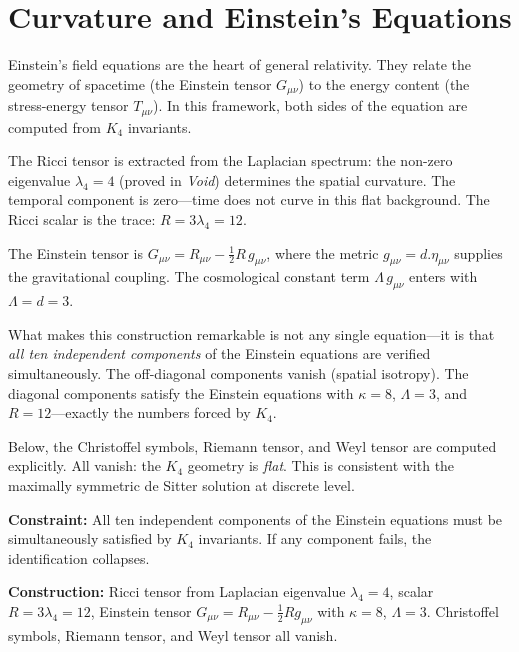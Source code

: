 \documentclass[11pt,a4paper]{book}
\def\cdot{.}%
\begin{document}
\chapter{Curvature and Einstein's Equations}
\label{ch:einstein-equations}

Einstein's field equations are the heart of general relativity. They relate the geometry of spacetime (the Einstein tensor $G_{\mu\nu}$) to the energy content (the stress-energy tensor $T_{\mu\nu}$). In this framework, both sides of the equation are computed from $K_4$ invariants.

The Ricci tensor is extracted from the Laplacian spectrum: the non-zero eigenvalue $\lambda_4 = 4$ (proved in \textit{Void}) determines the spatial curvature. The temporal component is zero---time does not curve in this flat background. The Ricci scalar is the trace: $R = 3\lambda_4 = 12$.

The Einstein tensor is $G_{\mu\nu} = R_{\mu\nu} - \frac{1}{2}R\,g_{\mu\nu}$, where the metric $g_{\mu\nu} = d \cdot \eta_{\mu\nu}$ supplies the gravitational coupling. The cosmological constant term $\Lambda\,g_{\mu\nu}$ enters with $\Lambda = d = 3$.

What makes this construction remarkable is not any single equation---it is that \emph{all ten independent components} of the Einstein equations are verified simultaneously. The off-diagonal components vanish (spatial isotropy). The diagonal components satisfy the Einstein equations with $\kappa = 8$, $\Lambda = 3$, and $R = 12$---exactly the numbers forced by $K_4$.

Below, the Christoffel symbols, Riemann tensor, and Weyl tensor are computed explicitly. All vanish: the $K_4$ geometry is \emph{flat}. This is consistent with the maximally symmetric de Sitter solution at discrete level.

\textbf{Constraint:} All ten independent components of the Einstein equations must be simultaneously satisfied by $K_4$ invariants. If any component fails, the identification collapses.

\textbf{Construction:} Ricci tensor from Laplacian eigenvalue $\lambda_4 = 4$, scalar $R = 3\lambda_4 = 12$, Einstein tensor $G_{\mu\nu} = R_{\mu\nu} - \tfrac{1}{2}Rg_{\mu\nu}$ with $\kappa = 8$, $\Lambda = 3$. Christoffel symbols, Riemann tensor, and Weyl tensor all vanish.
\end{document}
